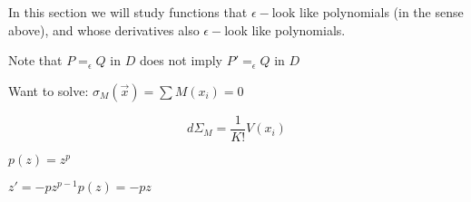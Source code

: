 \documentclass{article}
\begin{document}
In this section we will study functions that $\epsilon-$look like polynomials (in the sense above), and whose derivatives also $\epsilon-$look like polynomials.

Note that $P =_\epsilon Q$ in $D$ does not imply $P'=_\epsilon Q$ in $D$

Want to solve: $\sigma_M(\vec x) = \sum M(x_i) = 0$

$$d\Sigma_M = \frac 1 {K!} V(x_i)$$

$p(z) = z^p$

$z' = - p z^{p-1} p(z) = -p z$








\end{document}
